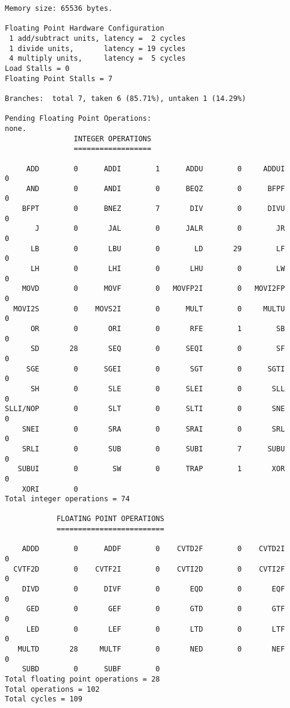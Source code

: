 \begin{verbatim}
Memory size: 65536 bytes.

Floating Point Hardware Configuration
 1 add/subtract units, latency =  2 cycles
 1 divide units,       latency = 19 cycles
 4 multiply units,     latency =  5 cycles
Load Stalls = 0
Floating Point Stalls = 7

Branches:  total 7, taken 6 (85.71%), untaken 1 (14.29%)

Pending Floating Point Operations:
none.
				INTEGER OPERATIONS
				==================

     ADD        0      ADDI        1      ADDU        0     ADDUI        0  
     AND        0      ANDI        0      BEQZ        0      BFPF        0  
    BFPT        0      BNEZ        7       DIV        0      DIVU        0  
       J        0       JAL        0      JALR        0        JR        0  
      LB        0       LBU        0        LD       29        LF        0  
      LH        0       LHI        0       LHU        0        LW        0  
    MOVD        0      MOVF        0   MOVFP2I        0   MOVI2FP        0  
  MOVI2S        0    MOVS2I        0      MULT        0     MULTU        0  
      OR        0       ORI        0       RFE        1        SB        0  
      SD       28       SEQ        0      SEQI        0        SF        0  
     SGE        0      SGEI        0       SGT        0      SGTI        0  
      SH        0       SLE        0      SLEI        0       SLL        0  
SLLI/NOP        0       SLT        0      SLTI        0       SNE        0  
    SNEI        0       SRA        0      SRAI        0       SRL        0  
    SRLI        0       SUB        0      SUBI        7      SUBU        0  
   SUBUI        0        SW        0      TRAP        1       XOR        0  
    XORI        0  
Total integer operations = 74

			FLOATING POINT OPERATIONS
			=========================

    ADDD        0      ADDF        0    CVTD2F        0    CVTD2I        0  
  CVTF2D        0    CVTF2I        0    CVTI2D        0    CVTI2F        0  
    DIVD        0      DIVF        0       EQD        0       EQF        0  
     GED        0       GEF        0       GTD        0       GTF        0  
     LED        0       LEF        0       LTD        0       LTF        0  
   MULTD       28     MULTF        0       NED        0       NEF        0  
    SUBD        0      SUBF        0  
Total floating point operations = 28
Total operations = 102
Total cycles = 109
\end{verbatim}

